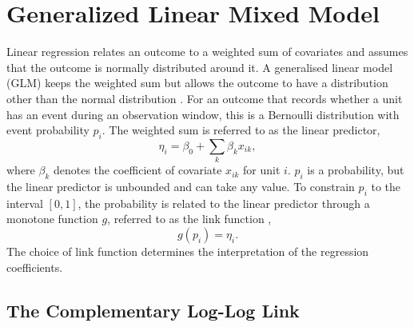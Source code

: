 \section{Generalized Linear Mixed Model}
\label{sec:tech-model}

Linear regression relates an outcome to a weighted sum of covariates and assumes that the outcome is normally distributed around it.
A generalised linear model (GLM) keeps the weighted sum but allows the outcome to have a distribution other than the normal distribution \cite[Section~3.4]{dobson2002glm}.
For an outcome that records whether a unit has an event during an observation window, this is a Bernoulli distribution with event probability $p_i$.
The weighted sum is referred to as the linear predictor,
\begin{equation}
  \eta_i = \beta_0 + \sum_{k} \beta_k x_{ik},
  \label{eq:tech-lp}
\end{equation}
where $\beta_k$ denotes the coefficient of covariate $x_{ik}$ for unit $i$.
$p_i$ is a probability, but the linear predictor is unbounded and can take any value. 
To constrain $p_i$ to the interval $[0, 1]$, the probability is related to the linear predictor through a monotone function $g$, referred to as the link function \cite[Sections~3.4 and~7.2]{dobson2002glm},
\begin{equation}
  g(p_i) = \eta_i .
  \label{eq:tech-link}
\end{equation}
The choice of link function determines the interpretation of the regression coefficients.

\subsection{The Complementary Log-Log Link}
\label{sec:tech-segment-glmm}


